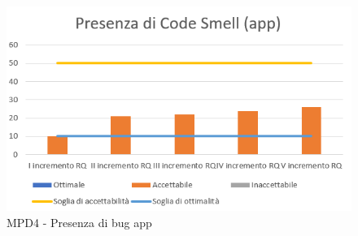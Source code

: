   \begin{figure}[h!]
    \centering
      \includegraphics[scale=1]{Immagini/CodeSmell APP.PNG}
    \caption{MPD4 - Presenza di bug app}
  \end{figure}